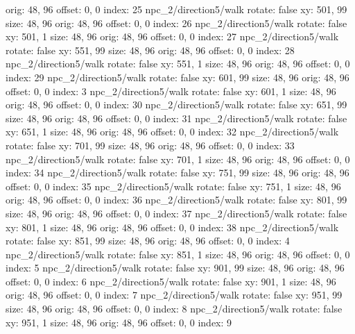  orig: 48, 96
  offset: 0, 0
  index: 25
npc_2/direction5/walk
  rotate: false
  xy: 501, 99
  size: 48, 96
  orig: 48, 96
  offset: 0, 0
  index: 26
npc_2/direction5/walk
  rotate: false
  xy: 501, 1
  size: 48, 96
  orig: 48, 96
  offset: 0, 0
  index: 27
npc_2/direction5/walk
  rotate: false
  xy: 551, 99
  size: 48, 96
  orig: 48, 96
  offset: 0, 0
  index: 28
npc_2/direction5/walk
  rotate: false
  xy: 551, 1
  size: 48, 96
  orig: 48, 96
  offset: 0, 0
  index: 29
npc_2/direction5/walk
  rotate: false
  xy: 601, 99
  size: 48, 96
  orig: 48, 96
  offset: 0, 0
  index: 3
npc_2/direction5/walk
  rotate: false
  xy: 601, 1
  size: 48, 96
  orig: 48, 96
  offset: 0, 0
  index: 30
npc_2/direction5/walk
  rotate: false
  xy: 651, 99
  size: 48, 96
  orig: 48, 96
  offset: 0, 0
  index: 31
npc_2/direction5/walk
  rotate: false
  xy: 651, 1
  size: 48, 96
  orig: 48, 96
  offset: 0, 0
  index: 32
npc_2/direction5/walk
  rotate: false
  xy: 701, 99
  size: 48, 96
  orig: 48, 96
  offset: 0, 0
  index: 33
npc_2/direction5/walk
  rotate: false
  xy: 701, 1
  size: 48, 96
  orig: 48, 96
  offset: 0, 0
  index: 34
npc_2/direction5/walk
  rotate: false
  xy: 751, 99
  size: 48, 96
  orig: 48, 96
  offset: 0, 0
  index: 35
npc_2/direction5/walk
  rotate: false
  xy: 751, 1
  size: 48, 96
  orig: 48, 96
  offset: 0, 0
  index: 36
npc_2/direction5/walk
  rotate: false
  xy: 801, 99
  size: 48, 96
  orig: 48, 96
  offset: 0, 0
  index: 37
npc_2/direction5/walk
  rotate: false
  xy: 801, 1
  size: 48, 96
  orig: 48, 96
  offset: 0, 0
  index: 38
npc_2/direction5/walk
  rotate: false
  xy: 851, 99
  size: 48, 96
  orig: 48, 96
  offset: 0, 0
  index: 4
npc_2/direction5/walk
  rotate: false
  xy: 851, 1
  size: 48, 96
  orig: 48, 96
  offset: 0, 0
  index: 5
npc_2/direction5/walk
  rotate: false
  xy: 901, 99
  size: 48, 96
  orig: 48, 96
  offset: 0, 0
  index: 6
npc_2/direction5/walk
  rotate: false
  xy: 901, 1
  size: 48, 96
  orig: 48, 96
  offset: 0, 0
  index: 7
npc_2/direction5/walk
  rotate: false
  xy: 951, 99
  size: 48, 96
  orig: 48, 96
  offset: 0, 0
  index: 8
npc_2/direction5/walk
  rotate: false
  xy: 951, 1
  size: 48, 96
  orig: 48, 96
  offset: 0, 0
  index: 9

